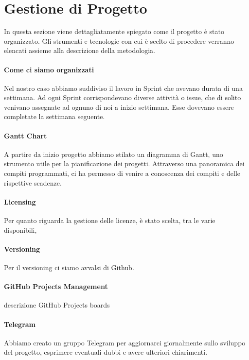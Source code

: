 \section{Gestione di Progetto}
In questa sezione viene dettagliatamente spiegato come il progetto è stato organizzato. Gli strumenti e tecnologie con cui è scelto di procedere verranno elencati assieme alla descrizione della metodologia.
    \paragraph{Come ci siamo organizzati}
    Nel nostro caso abbiamo suddiviso il lavoro in Sprint che avevano durata di una settimana. Ad ogni Sprint corrispondevano diverse attività o issue, che di solito venivano assegnate ad ognuno di noi a inizio settimana. Esse dovevano essere completate la settimana seguente.
    
    \paragraph{Gantt Chart} 
    A partire da inizio progetto abbiamo stilato un diagramma di Gantt, uno strumento utile per la pianificazione dei progetti. Attraverso una panoramica dei compiti programmati, ci ha permesso di venire a conoscenza dei compiti e delle rispettive scadenze.
    
    
    \paragraph{Licensing} Per quanto riguarda la gestione delle licenze, è stato scelta, tra le varie disponibili, 
    
    \paragraph{Versioning}
    Per il versioning ci siamo avvalsi di Github. 
    
    \paragraph{GitHub Projects Management}
    descrizione GitHub Projects boards 
    
    \paragraph{Telegram}
    Abbiamo creato un gruppo Telegram per aggiornarci giornalmente sullo sviluppo del progetto, esprimere eventuali dubbi e avere ulteriori chiarimenti. 
    
